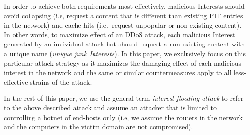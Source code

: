In order to achieve both requirements most effectively, malicious Interests should avoid collapsing (i.e, request a content that is different than existing PIT entries in the network) and cache hits (i.e., request unpopular or non-existing content). In other words, to maximize effect of an DDoS attack, each malicious Interest generated by an individual attack bot should request a non-existing content with a unique name (\emph{unique junk Interests}). In this paper, we exclusively focus on this particular attack strategy as it maximizes the damaging effect of each malicious interest in the network and the same or similar countermeasures apply to all less-effective strains of the attack. 

In the rest of this paper, we use the general term \emph{interest flooding attack} to refer to the above described attack and assume an attacker that is limited to controlling a botnet of end-hosts only (i.e, we assume the routers in the network and the computers in the victim domain are not compromised).






